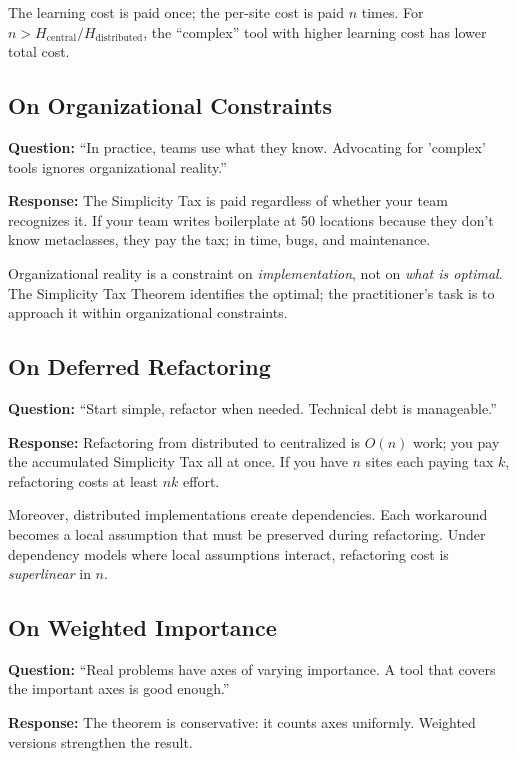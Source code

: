 The learning cost is paid once; the per-site cost is paid $n$ times. For $n > H_{\text{central}} / H_{\text{distributed}}$, the ``complex'' tool with higher learning cost has lower total cost.

\subsection{On Organizational Constraints}

\textbf{Question:} ``In practice, teams use what they know. Advocating for 'complex' tools ignores organizational reality.''

\textbf{Response:} The Simplicity Tax is paid regardless of whether your team recognizes it. If your team writes boilerplate at 50 locations because they don't know metaclasses, they pay the tax; in time, bugs, and maintenance.

Organizational reality is a constraint on \emph{implementation}, not on \emph{what is optimal}. The Simplicity Tax Theorem identifies the optimal; the practitioner's task is to approach it within organizational constraints.

\subsection{On Deferred Refactoring}

\textbf{Question:} ``Start simple, refactor when needed. Technical debt is manageable.''

\textbf{Response:} Refactoring from distributed to centralized is $O(n)$ work; you pay the accumulated Simplicity Tax all at once. If you have $n$ sites each paying tax $k$, refactoring costs at least $nk$ effort.

Moreover, distributed implementations create dependencies. Each workaround becomes a local assumption that must be preserved during refactoring. Under dependency models where local assumptions interact, refactoring cost is \emph{superlinear} in $n$.

\subsection{On Weighted Importance}

\textbf{Question:} ``Real problems have axes of varying importance. A tool that covers the important axes is good enough.''

\textbf{Response:} The theorem is conservative: it counts axes uniformly. Weighted versions strengthen the result.

